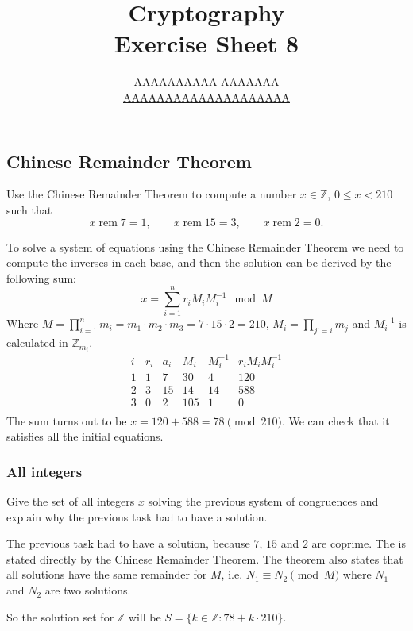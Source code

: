 \documentclass{article}
\title{Cryptography \\ Exercise Sheet 8}
\author{
  AAAAAAAAAA AAAAAAA \\
  \href{mailto:AAAAAAAAAAAAAAAAAAAA}{AAAAAAAAAAAAAAAAAAAA}
}
\newcommand{\Z}{\mathbb{Z}}
\begin{document}
  \maketitle

  \setcounter{section}{8}
  \subsection{Chinese Remainder Theorem}
  \begin{centerframebox}
    Use the Chinese Remainder Theorem to compute a number $x \in \Z$, $0 \leq x < 210$ such that
    \[ x \operatorname{rem} 7 = 1, \qquad x \operatorname{rem} 15 = 3, \qquad x \operatorname{rem} 2 = 0. \]
  \end{centerframebox}
  To solve a system of equations using the Chinese Remainder Theorem we need to compute the inverses in each base,
  and then the solution can be derived by the following sum:
  \[ x = \sum_{i=1}^n r_i M_i M_i^{-1} \mod M \]
  Where $M = \prod_{i=1}^n m_i = m_1 \cdot m_2 \cdot m_3 = 7 \cdot 15 \cdot 2 = 210$, $M_i = \prod_{j != i} m_j$
  and $M_i^{-1}$ is calculated in $\Z_{m_i}$.
  \[
    \begin{array}{c|c|c|c|c|c}
      i & r_i & a_i & M_i & M_i^{-1} & r_i M_i M_i^{-1} \\
      \hline
      1 & 1 & 7 & 30 & 4 & 120 \\
      2 & 3 & 15 & 14 & 14 & 588 \\
      3 & 0 & 2 & 105 & 1 & 0 \\
    \end{array}
  \]
  The sum turns out to be $x = 120+588 = 78 \pmod{210}$. We can check that it satisfies all the initial equations.

  \subsubsection{All integers}
  \begin{centerframebox}
    Give the set of all integers $x$ solving the previous system of congruences and explain why the previous task had to have a solution.
  \end{centerframebox}
  The previous task had to have a solution, because $7$, $15$ and $2$ are coprime.
  The is stated directly by the Chinese Remainder Theorem.
  The theorem also states that all solutions have the same remainder for $M$,
  i.e. $N_1 \equiv N_2 \pmod{M}$ where $N_1$ and $N_2$ are two solutions.

  So the solution set for $\Z$ will be $S = \{k \in \Z : 78 + k \cdot 210\}$.
\end{document}
